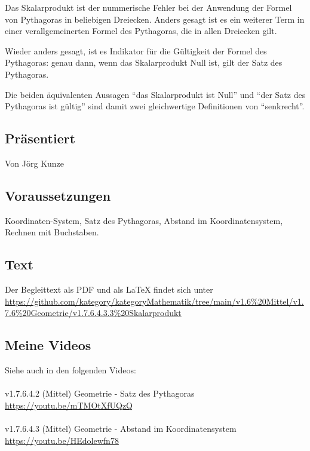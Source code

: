 \documentclass[a4paper]{amsart}
\theoremstyle{definition}
\begin{document}
Das Skalarprodukt ist der nummerische Fehler bei der Anwendung der Formel von Pythagoras in beliebigen Dreiecken. Anders gesagt ist es ein weiterer Term in einer verallgemeinerten Formel des Pythagoras, die in allen Dreiecken gilt.

Wieder anders gesagt, ist es Indikator für die Gültigkeit der Formel des Pythagoras: genau dann, wenn das Skalarprodukt Null ist, gilt der Satz des Pythagoras.

Die beiden äquivalenten Aussagen "`das Skalarprodukt ist Null"' und "`der Satz des Pythagoras ist gültig"' sind damit zwei gleichwertige Definitionen von "`senkrecht"'.

\subsection*{Präsentiert}
Von Jörg Kunze

\subsection*{Voraussetzungen}
Koordinaten-System, Satz des Pythagoras, Abstand im Koordinatensystem, Rechnen mit Buchstaben.

\subsection*{Text}
Der Begleittext als PDF und als LaTeX findet sich unter
{\tiny
   \url{https://github.com/kategory/kategoryMathematik/tree/main/v1.6%20Mittel/v1.7.6%20Geometrie/v1.7.6.4.3.3%20Skalarprodukt}
}

\subsection*{Meine Videos}
Siehe auch in den folgenden Videos:\\
\\
v1.7.6.4.2 (Mittel) Geometrie - Satz des Pythagoras\\
\url{https://youtu.be/mTMOtXfUQzQ}\\
\\
v1.7.6.4.3 (Mittel) Geometrie - Abstand im Koordinatensystem\\
\url{https://youtu.be/HEdolewfn78}
\end{document}
